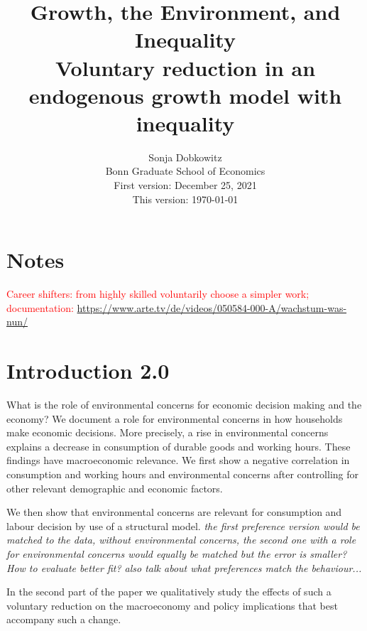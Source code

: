\documentclass[12pt]{article}
\title{Growth, the Environment, and Inequality\\ \small{ Voluntary reduction in an endogenous growth model with inequality}}
\date{Sonja Dobkowitz\\ Bonn Graduate School of Economics\\ %
	\vspace{1mm}
	First version: December 25, 2021\\
	This version: \today }
\newcommand{\tr}[1]{\textcolor{red}{#1}}
\begin{document}
	\maketitle

\section{Notes}
\tr{Career shifters: from highly skilled voluntarily choose a simpler work; documentation: \url{https://www.arte.tv/de/videos/050584-000-A/wachstum-was-nun/} }

\section{Introduction 2.0}
What is the role of environmental concerns for economic decision making and the economy?
We document a role for environmental concerns in how households make economic decisions. 
More precisely, a rise in environmental concerns explains a decrease in consumption of durable goods and working hours. These findings have macroeconomic relevance. 
We first show a negative correlation in consumption and working hours and environmental concerns after controlling for other relevant demographic and economic factors. 

We then show that environmental concerns are relevant for consumption and labour decision by use of a structural model. \textit{the first preference version would be matched to the data, without environmental concerns, the second one with a role for environmental concerns would equally be matched but the error is smaller? How to evaluate better fit? \cite{Bartling2015DoResponsibility} also talk about what preferences match the behaviour...}

In the second part of the paper we qualitatively study the effects of such a voluntary reduction on the macroeconomy and policy implications that best accompany such a change. 

	
\end{document}

